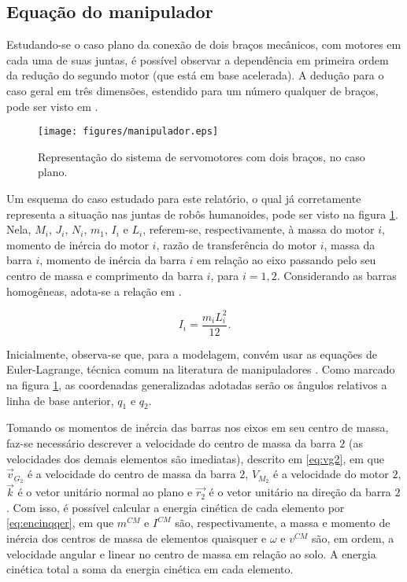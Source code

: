 \subsection{Equação do manipulador}

Estudando-se o caso plano da conexão de dois braços mecânicos, com motores em cada uma de suas juntas, é possível observar a dependência em primeira ordem da redução do segundo motor (que está em base acelerada). A dedução para o caso geral em três dimensões, estendido para um número qualquer de braços, pode ser visto em \cite{nasareport}. 

\begin{figure}
\centering
\texttt{[image: figures/manipulador.eps]}
\caption{Representação do sistema de servomotores com dois braços, no caso plano.}
\label{fig:manipulador}
\end{figure}

Um esquema do caso estudado para este relatório, o qual já corretamente representa a situação nas juntas de robôs humanoides, pode ser visto na figura \ref{fig:manipulador}. Nela, $M_i$, $J_i$, $N_i$, $m_1$, $I_i$ e $L_i$, referem-se, respectivamente, à massa do motor $i$, momento de inércia do motor $i$, razão de transferência do motor $i$, massa da barra $i$, momento de inércia da barra $i$ em relação ao eixo passando pelo seu centro de massa e comprimento da barra $i$, para $i = 1,2$. Considerando as barras homogêneas, adota-se a relação em .

\begin{equation}
\label{eq:inerciabarra}
I_i = \frac{m_i L_i^2}{12}.
\end{equation}

Inicialmente, observa-se que, para a modelagem, convém usar as equações de Euler-Lagrange, técnica comum na literatura de manipuladores \cite{craig1986}. Como marcado na figura \ref{fig:manipulador}, as coordenadas generalizadas adotadas serão os ângulos relativos a linha de base anterior, $q_1$ e $q_2$.

Tomando os momentos de inércia das barras nos eixos em seu centro de massa, faz-se necessário descrever a velocidade do centro de massa da barra $2$ (as velocidades dos demais elementos são imediatas), descrito em \ref{eq:vg2}, em que $\vec{v}_{G_2}$ é a velocidade do centro de massa da barra $2$, $V_{M_2}$ é a velocidade do motor $2$, $\vec{k}$ é o vetor unitário normal ao plano e $\vec{r_2}$ é o vetor unitário na direção da barra $2$. Com isso, é possível calcular a energia cinética de cada elemento por \eqref{eq:encinqqer}, em que $m^{CM}$ e $I^{CM}$ são, respectivamente, a massa e momento de inércia dos centros de massa de elementos quaisquer e $\omega$ e $v^{CM}$ são, em ordem, a velocidade angular e linear no centro de massa em relação ao solo. A energia cinética total a soma da energia cinética em cada elemento. 


